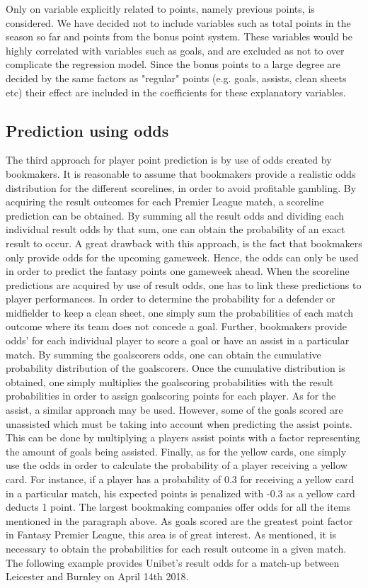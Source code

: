 Only on variable explicitly related to points, namely previous points, is considered. We have decided not to include variables such as total points in the season so far and points from the bonus point system. These variables would be highly correlated with variables such as goals, and are excluded as not to over complicate the regression model. Since the bonus points to a large degree are decided by the same factors as "regular" points (e.g. goals, assists, clean sheets etc) their effect are included in the coefficients for these explanatory variables. 


\subsection{Prediction using odds}
The third approach for player point prediction is by use of odds created by bookmakers. It is reasonable to assume that bookmakers provide a realistic odds distribution for the different scorelines, in order to avoid profitable gambling. By acquiring the result outcomes for each Premier League match, a scoreline prediction can be obtained. By summing all the result odds and dividing each individual result odds by that sum, one can obtain the probability of an exact result to occur. A great drawback with this approach, is the fact that bookmakers only provide odds for the upcoming gameweek. Hence, the odds can only be used in order to predict the fantasy points one gameweek ahead. 
\newpar
When the scoreline predictions are acquired by use of result odds, one has to link these predictions to player performances. In order to determine the probability for a defender or midfielder to keep a clean sheet, one simply sum the probabilities of each match outcome where its team does not concede a goal. Further, bookmakers provide odds' for each individual player to score a goal or have an assist in a particular match. By summing the goalscorers odds, one can obtain the cumulative probability distribution of the goalscorers. Once the cumulative distribution is obtained, one simply multiplies the goalscoring probabilities with the result probabilities in order to assign goalscoring points for each player. As for the assist, a similar approach may be used. However, some of the goals scored are unassisted which must be taking into account when predicting the assist points. This can be done by multiplying a players assist points with a factor representing the amount of goals being assisted. Finally, as for the yellow cards, one simply use the odds in order to calculate the probability of a player receiving a yellow card. For instance, if a player has a probability of 0.3 for receiving a yellow card in a particular match, his expected points is penalized with -0.3 as a yellow card deducts 1 point. 
\newpar
The largest bookmaking companies offer odds for all the items mentioned in the paragraph above. As goals scored are the greatest point factor in Fantasy Premier League, this area is of great interest. As mentioned, it is necessary to obtain the probabilities for each result outcome in a given match. The following example provides Unibet's result odds for a match-up between Leicester and Burnley on April 14th 2018. 

